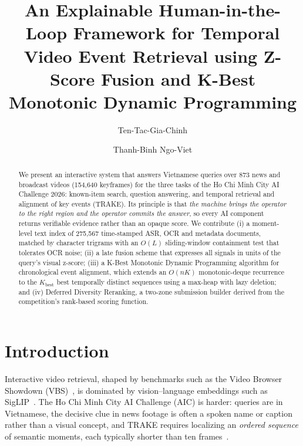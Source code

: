 \documentclass[runningheads]{llncs}
\newcommand{\Kb}{K_{\mathrm{best}}}
\begin{document}
%
\title{An Explainable Human-in-the-Loop Framework for Temporal Video Event Retrieval using Z-Score Fusion and K-Best Monotonic Dynamic Programming}
%
\author{Ten-Tac-Gia-Chinh \and
Thanh-Binh Ngo-Viet}


%
\maketitle
%
\begin{abstract}
We present an interactive system that answers Vietnamese queries over 873 news and broadcast videos (154,640 keyframes) for the three tasks of the Ho Chi Minh City AI Challenge 2026: known-item search, question answering, and temporal retrieval and alignment of key events (TRAKE). Its principle is that \emph{the machine brings the operator to the right region and the operator commits the answer}, so every AI component returns verifiable evidence rather than an opaque score. We contribute (i) a moment-level text index of 275,567 time-stamped ASR, OCR and metadata documents, matched by character trigrams with an $O(L)$ sliding-window containment test that tolerates OCR noise; (ii) a late fusion scheme that expresses all signals in units of the query's visual z-score; (iii) a K-Best Monotonic Dynamic Programming algorithm for chronological event alignment, which extends an $O(nK)$ monotonic-deque recurrence to the $\Kb$ best temporally distinct sequences using a max-heap with lazy deletion; and (iv) Deferred Diversity Reranking, a two-zone submission builder derived from the competition's rank-based scoring function.
\end{abstract}
%
\section{Introduction}

Interactive video retrieval, shaped by benchmarks such as the Video Browser Showdown (VBS)~\cite{vadicamo2024vbs}, is dominated by vision--language embeddings such as SigLIP~\cite{zhai2023siglip}. The Ho Chi Minh City AI Challenge (AIC) is harder: queries are in Vietnamese, the decisive clue in news footage is often a spoken name or caption rather than a visual concept, and TRAKE requires localizing an \emph{ordered sequence} of semantic moments, each typically shorter than ten frames~\cite{do2025abstraction}.
\end{document}
